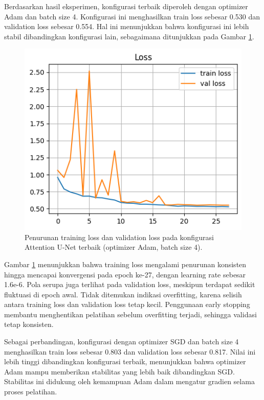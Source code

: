 \noindent Berdasarkan hasil eksperimen, konfigurasi terbaik diperoleh dengan optimizer Adam dan batch size 4. Konfigurasi ini menghasilkan train loss sebesar 0.530 dan validation loss sebesar 0.554. Hal ini menunjukkan bahwa konfigurasi ini lebih stabil dibandingkan konfigurasi lain, sebagaimana ditunjukkan pada Gambar \ref{fig:loss_attention_terbaik}.

\begin{figure}[H]
	\centering
	\includegraphics[scale=.8]{gambar/bab4/loss_adam_attention_u-net_4.png}
	\caption{Penurunan training loss dan validation loss pada konfigurasi Attention U-Net terbaik (optimizer Adam, batch size 4).}
	\label{fig:loss_attention_terbaik}
\end{figure}

\noindent Gambar \ref{fig:loss_attention_terbaik} menunjukkan bahwa training loss mengalami penurunan konsisten hingga mencapai konvergensi pada epoch ke-27, dengan learning rate sebesar 1.6e-6. Pola serupa juga terlihat pada validation loss, meskipun terdapat sedikit fluktuasi di epoch awal. Tidak ditemukan indikasi overfitting, karena selisih antara training loss dan validation loss tetap kecil. Penggunaan early stopping membantu menghentikan pelatihan sebelum overfitting terjadi, sehingga validasi tetap konsisten.

\noindent Sebagai perbandingan, konfigurasi dengan optimizer SGD dan batch size 4 menghasilkan train loss sebesar 0.803 dan validation loss sebesar 0.817. Nilai ini lebih tinggi dibandingkan konfigurasi terbaik, menunjukkan bahwa optimizer Adam mampu memberikan stabilitas yang lebih baik dibandingkan SGD. Stabilitas ini didukung oleh kemampuan Adam dalam mengatur gradien selama proses pelatihan.



